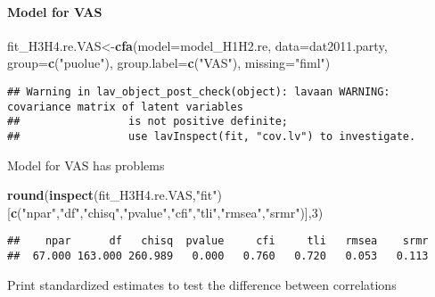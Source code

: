 \documentclass[
]{article}
\newenvironment{Shaded}{\begin{snugshade}}{\end{snugshade}}
\newcommand{\DataTypeTok}[1]{\textcolor[rgb]{0.13,0.29,0.53}{#1}}
\newcommand{\DecValTok}[1]{\textcolor[rgb]{0.00,0.00,0.81}{#1}}
\newcommand{\KeywordTok}[1]{\textcolor[rgb]{0.13,0.29,0.53}{\textbf{#1}}}
\newcommand{\NormalTok}[1]{#1}
\newcommand{\StringTok}[1]{\textcolor[rgb]{0.31,0.60,0.02}{#1}}
\begin{document}
\newpage

\hypertarget{model-for-vas}{%
\paragraph{Model for VAS}\label{model-for-vas}}

\begin{Shaded}
\begin{Highlighting}[]
\NormalTok{fit_H3H4.re.VAS<-}\KeywordTok{cfa}\NormalTok{(}\DataTypeTok{model=}\NormalTok{model_H1H2.re,}
                    \DataTypeTok{data=}\NormalTok{dat2011.party,}
                    \DataTypeTok{group=}\KeywordTok{c}\NormalTok{(}\StringTok{"puolue"}\NormalTok{),}
                    \DataTypeTok{group.label=}\KeywordTok{c}\NormalTok{(}\StringTok{"VAS"}\NormalTok{),}
                    \DataTypeTok{missing=}\StringTok{"fiml"}\NormalTok{)}
\end{Highlighting}
\end{Shaded}

\begin{verbatim}
## Warning in lav_object_post_check(object): lavaan WARNING: covariance matrix of latent variables
##                 is not positive definite;
##                 use lavInspect(fit, "cov.lv") to investigate.
\end{verbatim}

Model for VAS has problems

\begin{Shaded}
\begin{Highlighting}[]
\KeywordTok{round}\NormalTok{(}\KeywordTok{inspect}\NormalTok{(fit_H3H4.re.VAS,}\StringTok{"fit"}\NormalTok{)}
\NormalTok{      [}\KeywordTok{c}\NormalTok{(}\StringTok{"npar"}\NormalTok{,}\StringTok{"df"}\NormalTok{,}\StringTok{"chisq"}\NormalTok{,}\StringTok{"pvalue"}\NormalTok{,}\StringTok{"cfi"}\NormalTok{,}\StringTok{"tli"}\NormalTok{,}\StringTok{"rmsea"}\NormalTok{,}\StringTok{"srmr"}\NormalTok{)],}\DecValTok{3}\NormalTok{)}
\end{Highlighting}
\end{Shaded}

\begin{verbatim}
##    npar      df   chisq  pvalue     cfi     tli   rmsea    srmr 
##  67.000 163.000 260.989   0.000   0.760   0.720   0.053   0.113
\end{verbatim}

Print standardized estimates to test the difference between correlations
\end{document}
